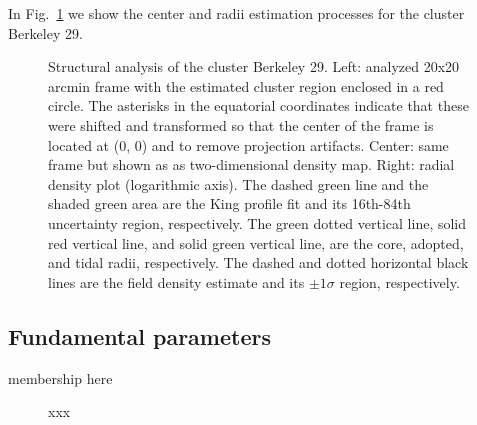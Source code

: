\documentclass{aa}
\begin{document}
  In Fig.~\ref{fig:BER29_struct} we show the center and radii estimation
  processes for the cluster Berkeley 29.

  \begin{figure}
   \caption{Structural analysis of the cluster Berkeley 29. Left: analyzed
   20x20 arcmin frame with the estimated cluster region enclosed in a red circle.
   The asterisks in the equatorial coordinates indicate that these were shifted
   and transformed so that the center of the frame is located at (0, 0) and to
   remove projection artifacts. Center:
   same frame but shown as as two-dimensional density map. Right: radial density
   plot (logarithmic axis). The dashed green line and the shaded green area are
   the King profile fit and its 16th-84th uncertainty region, respectively. The
   green dotted vertical line, solid red vertical line, and solid green vertical
   line, are the core, adopted, and tidal radii, respectively. The dashed and
   dotted horizontal black lines are the field density estimate and its $\pm
   1\sigma$ region, respectively.}
   \label{fig:BER29_struct}
  \end{figure}


 \subsection{Fundamental parameters}
  \label{ssec:fund_pars}

  membership here

  \begin{figure}
   \caption{xxx}
   \label{fig:BER29_fpars}
  \end{figure}
\end{document}
